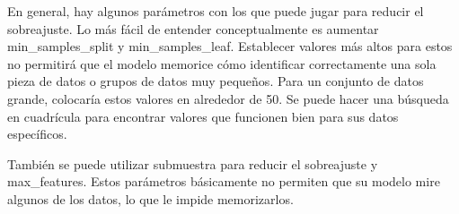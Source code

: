 \documentclass[12pt,twoside]{report}
\begin{document}
En general, hay algunos parámetros con los que puede jugar para reducir el sobreajuste. Lo más fácil de entender conceptualmente es aumentar min\_samples\_split y min\_samples\_leaf. Establecer valores más altos para estos no permitirá que el modelo memorice cómo identificar correctamente una sola pieza de datos o grupos de datos muy pequeños. Para un conjunto de datos grande, colocaría estos valores en alrededor de 50. Se puede hacer una búsqueda en cuadrícula para encontrar valores que funcionen bien para sus datos específicos.

También se puede utilizar submuestra para reducir el sobreajuste y max\_features. Estos parámetros básicamente no permiten que su modelo mire algunos de los datos, lo que le impide memorizarlos.

\begin{table}[ht!]
\begin{center}
\end{center}
\end{table}
\end{document}

